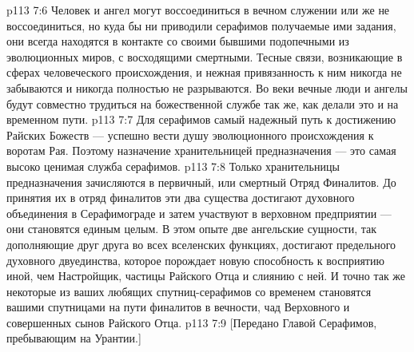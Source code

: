 \vs p113 7:6 Человек и ангел могут воссоединиться в вечном служении или же не воссоединиться, но куда бы ни приводили серафимов получаемые ими задания, они всегда находятся в контакте со своими бывшими подопечными из эволюционных миров, с восходящими смертными. Тесные связи, возникающие в сферах человеческого происхождения, и нежная привязанность к ним никогда не забываются и никогда полностью не разрываются. Во веки вечные люди и ангелы будут совместно трудиться на божественной службе так же, как делали это и на временном пути.
\vs p113 7:7 \pc Для серафимов самый надежный путь к достижению Райских Божеств --- успешно вести душу эволюционного происхождения к воротам Рая. Поэтому назначение хранительницей предназначения --- это самая высоко ценимая служба серафимов.
\vs p113 7:8 Только хранительницы предназначения зачисляются в первичный, или смертный Отряд Финалитов. До принятия их в отряд финалитов эти два существа достигают духовного объединения в Серафимограде и затем участвуют в верховном предприятии --- они становятся единым целым. В этом опыте две ангельские сущности, так дополняющие друг друга во всех вселенских функциях, достигают предельного духовного двуединства, которое порождает новую способность к восприятию иной, чем Настройщик, частицы Райского Отца и слиянию с ней. И точно так же некоторые из ваших любящих спутниц\hyp{}серафимов со временем становятся вашими спутницами на пути финалитов в вечности, чад Верховного и совершенных сынов Райского Отца.
\vsetoff
\vs p113 7:9 [Передано Главой Серафимов, пребывающим на Урантии.]
